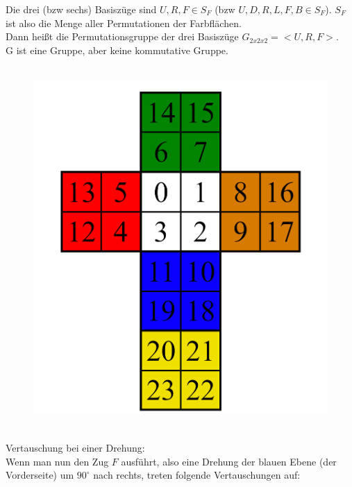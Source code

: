 \documentclass[12pt,a4paper, usenames, dvipsnames]{scrartcl}
\begin{document}
Die drei (bzw sechs) Basiszüge sind $U, R, F \in S_F$ (bzw $U, D, R, L, F, B \in S_F$). $S_F$ ist also die Menge aller Permutationen der Farbflächen. \\
Dann heißt die Permutationsgruppe der drei Basiszüge $G_{2x2x2}=<U, R, F>$. \\
G ist eine Gruppe, aber keine kommutative Gruppe. \color{orange}{(?)} \color{black}\\
\\
\begin{figure}[h]
\centering
\includegraphics[scale=0.18]{2x2foldedout.png}
\end{figure}
\\
Vertauschung bei einer Drehung: \\
Wenn man nun den Zug $F$ ausführt, also eine Drehung der blauen Ebene (der Vorderseite) um $90^\circ$ nach rechts, treten folgende Vertauschungen auf: \\ \\
\end{document}
